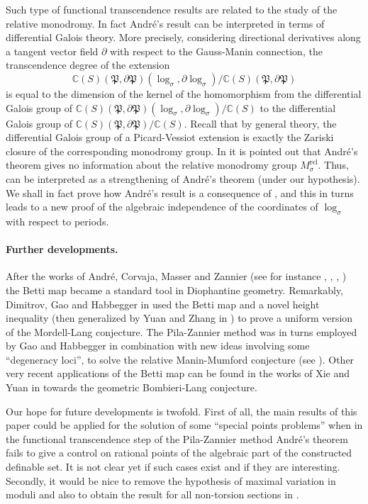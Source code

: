 \documentclass[10 pt,a4paper]{article}
\theoremstyle{plain}
\theoremstyle{definition}
\theoremstyle{named}
\newcommand{\bC}{\mathbb C}
\newcommand{\fP}{\mathfrak P}
\begin{document}
Such type of functional transcendence results are related to the study of the relative monodromy. In fact Andr\'e's result can be interpreted in terms of differential Galois theory. More precisely, considering directional derivatives along a tangent vector field $\partial$ with respect to the Gauss-Manin connection, the transcendence degree of the extension
\[
\bC(S)(\fP,\partial\fP)(\log_\sigma, \partial\log_\sigma)/\bC(S)(\fP,\partial\fP)
\]
is equal to the dimension of the kernel of the homomorphism from the differential Galois group of $\bC(S)(\fP,\partial\fP)(\log_\sigma, \partial\log_\sigma)/\bC(S)$ to the differential Galois group of $\bC(S)(\fP,\partial\fP)/\bC(S)$. Recall that by general theory, the differential Galois group of a Picard-Vessiot extension is exactly the Zariski closure of the corresponding monodromy group. In \cite{CZ} it is pointed out that André's theorem gives no information about the relative monodromy group $M_\sigma^\textrm{rel}$. Thus,  can be interpreted as a strengthening of André's theorem (under our hypothesis). We shall in fact prove how André's result is a consequence of , and  this in turns leads to a new proof of the algebraic independence of the coordinates of $\log_\sigma$ with respect to periods.

\paragraph{Further developments.} After the works of Andr\'e, Corvaja, Masser and Zannier (see for instance \cite{ACZ}, \cite{CMZ}, \cite{CZ}, \cite{Zbook}) the Betti map became a standard tool in Diophantine geometry. Remarkably,  Dimitrov, Gao and Habbegger in \cite {DGH} used the Betti map and a novel height inequality (then generalized by Yuan and Zhang in \cite{YZ}) to prove a uniform version of the Mordell-Lang conjecture. The Pila-Zannier method was in turns employed by Gao and Habbegger in combination with  new ideas involving some ``degeneracy loci'', to  solve the  relative Manin-Mumford conjecture (see \cite{GH}). Other very recent applications of the Betti map can be found in the works of Xie and Yuan in \cite{XY} towards the geometric Bombieri-Lang conjecture. 

Our hope  for future developments is twofold. First of all, the main results of this paper could be applied for the solution of some ``special points problems'' when in the functional transcendence step of the Pila-Zannier method  André's theorem fails to give a control on rational points of the algebraic part of the constructed definable set. It is not clear yet if such cases exist and if they are interesting. Secondly, it would be nice to remove the hypothesis of maximal variation in moduli and also to obtain the result for all non-torsion sections in .
\end{document}
